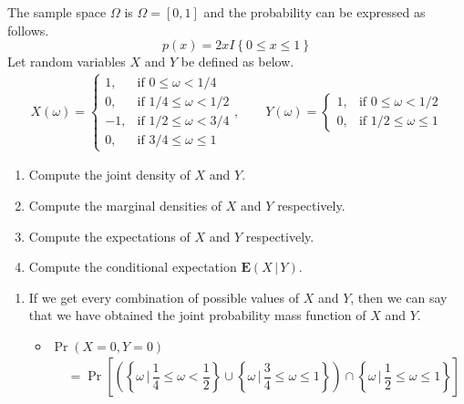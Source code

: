 \documentclass[answers]{exam}
\begin{document}
\newpage
{}
\begin{questions}
  \question
  The sample space $\Omega$ is $\Omega=[0,1]$ and the probability can be expressed as follows.
  \begin{equation}
    p(x) = 2xI\left\lbrace 0\leq x \leq 1\right\rbrace
  \end{equation}
  Let random variables $X$ and $Y$ be defined as below.
  \begin{align}
    X(\omega) = \begin{cases}1, & \text{if $0\leq \omega < 1/4$}\\ 0, & \text{if $1/4\leq \omega < 1/2$}\\ -1, & \text{if $1/2\leq \omega <3/4$}\\ 0, & \text{if $3/4 \leq \omega \leq 1$} \end{cases}, \qquad Y(\omega) = \begin{cases}1, & \text{if $0\leq \omega < 1/2$}\\ 0, & \text{if $1/2\leq \omega \leq 1$} \end{cases}
  \end{align}
  \begin{enumerate}[(1)]
    \item Compute the joint density of $X$ and $Y$.
    \item Compute the marginal densities of $X$ and $Y$ respectively.
    \item Compute the expectations of $X$ and $Y$ respectively.
    \item Compute the conditional expectation $\mathbf{E}(X\,|\,Y)$.
  \end{enumerate}
  \begin{solution}
    \begin{enumerate}[(1)]
      \item If we get every combination of possible values of $X$ and $Y$, then we can say that we have obtained the joint probability mass function of $X$ and $Y$.
      \begin{itemize}
        \item $\Pr(X=0,Y=0)$
        \begin{align}
          &= \Pr\left[\left(\left\lbrace \omega\,|\, \dfrac{1}{4}\leq\omega <\dfrac{1}{2}\right\rbrace \cup \left\lbrace \omega\,|\, \dfrac{3}{4}\leq \omega \leq 1 \right\rbrace\right)\cap \left\lbrace \omega\,|\, \dfrac{1}{2}\leq \omega\leq 1\right\rbrace\right]\\

\end{align}
\end{itemize}
\end{enumerate}
\end{solution}
\end{questions}
\end{document}
